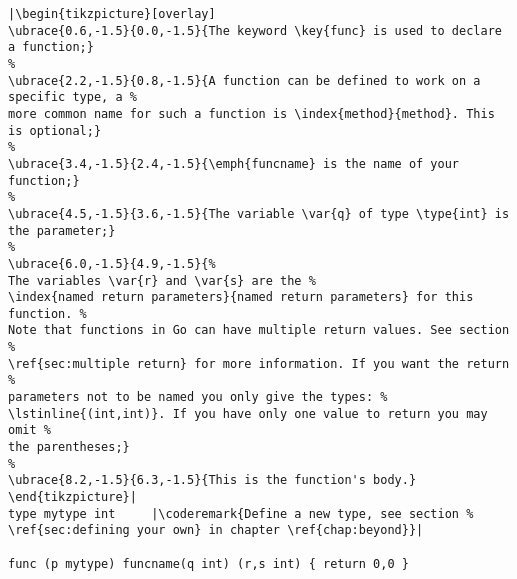 \begin{lstlisting}[caption=A function declaration,label=src:function definition]
|\begin{tikzpicture}[overlay]
\ubrace{0.6,-1.5}{0.0,-1.5}{The keyword \key{func} is used to declare a function;}
%
\ubrace{2.2,-1.5}{0.8,-1.5}{A function can be defined to work on a specific type, a %
more common name for such a function is \index{method}{method}. This is optional;}
%
\ubrace{3.4,-1.5}{2.4,-1.5}{\emph{funcname} is the name of your function;}
%
\ubrace{4.5,-1.5}{3.6,-1.5}{The variable \var{q} of type \type{int} is the parameter;}
%
\ubrace{6.0,-1.5}{4.9,-1.5}{%
The variables \var{r} and \var{s} are the %
\index{named return parameters}{named return parameters} for this function. %
Note that functions in Go can have multiple return values. See section %
\ref{sec:multiple return} for more information. If you want the return %
parameters not to be named you only give the types: %
\lstinline{(int,int)}. If you have only one value to return you may omit %
the parentheses;}
%
\ubrace{8.2,-1.5}{6.3,-1.5}{This is the function's body.}
\end{tikzpicture}|
type mytype int	    |\coderemark{Define a new type, see section %
\ref{sec:defining your own} in chapter \ref{chap:beyond}}|

func (p mytype) funcname(q int) (r,s int) { return 0,0 }
\end{lstlisting}
